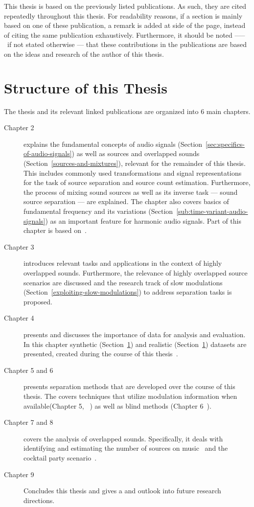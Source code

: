 This thesis is based on the previously listed publications. As such, they are cited repeatedly throughout this thesis. For readability reasons, if a section is mainly based on one of these publication, a remark is added at side of the page, instead of citing the same publication exhaustively. Furthermore, it should be noted ––– if not stated otherwise ---  that these contributions in the publications are based on the ideas and research of the author of this thesis.

\section{Structure of this Thesis}

The thesis and its relevant linked publications are organized into 6 main chapters.
\begin{description}
  \item[Chapter 2] explains the fundamental concepts of audio signals (Section~\ref{sec:specifics-of-audio-signals}) as well as sources and overlapped sounds (Section~\ref{sources-and-mixtures}), relevant for the remainder of this thesis. 
  This includes commonly used transformations and signal representations for the task of source separation and source count estimation.
  Furthermore, the process of mixing sound sources as well as its inverse task --- sound source separation --- are explained.
  The chapter also covers basics of fundamental frequency and its variations (Section~\ref{sub:time-variant-audio-signals}) as an important feature for harmonic audio signals.
  Part of this chapter is based on~\cite{rafii18}.
  \item[Chapter 3] introduces relevant tasks and applications in the context of highly overlapped sounds.
  Furthermore, the relevance of highly overlapped source scenarios are discussed and the research track of slow  modulations (Section~\ref{exploiting-slow-modulations}) to address separation tasks is proposed.
  \item[Chapter 4] presents and discusses the importance of data for analysis and evaluation.
  In this chapter synthetic (Section~\ref{}) and realistic (Section~\ref{}) datasets are presented, created during the course of this thesis~\cite{oss_wice, oss_unison, oss_libricount, stoeter15acm, liutkus17}.
  \item[Chapter 5 and 6] presents separation methods that are developed over the course of this thesis. 
  The covers techniques that utilize modulation information when available(Chapter 5, ~\cite{stoeter14, stoeter15icassp}) as well as blind methods (Chapter 6~\cite{stoeter16, liutkus17}).
  \item[Chapter 7 and 8] covers the analysis of overlapped sounds. Specifically, it deals with identifying and estimating the number of sources on music~\cite{schoeffler13, stoeter13} and the cocktail party scenario~\cite{stoeter19, stoeter18}.
  \item[Chapter 9] Concludes this thesis and gives a and outlook into future research directions.
\end{description}

